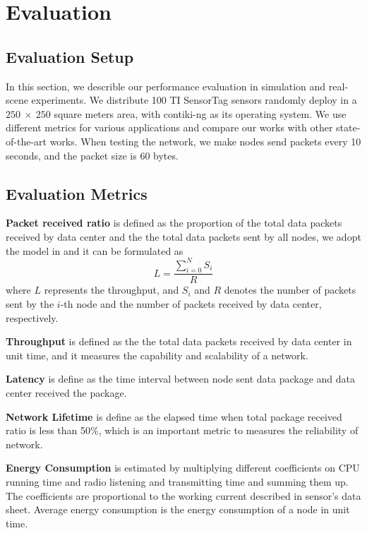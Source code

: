 \section{Evaluation}
\label{Eva}

\subsection{Evaluation Setup}
In this section, we describle our performance evaluation in simulation and
real-scene experiments. We distribute 100 TI SensorTag sensors randomly deploy in a
$250~\times~250$ square meters area, with contiki-ng as its operating system. We
use different metrics for various applications and compare our works with other
state-of-the-art works. When testing the network, we make nodes send packets
every 10 seconds, and the packet size is 60 bytes.

\subsection{Evaluation Metrics}

\textbf{Packet received ratio} is defined as the proportion of the total data
packets received by data center and the the total data packets sent by all nodes, 
we adopt the model in \cite{chen2017energy}
and it can be formulated as
\begin{equation}
	L = \frac{\sum_{i = 0}^{N}S_i}{R}
\end{equation}
where $L$ represents the throughput, and $S_i$ and $R$ denotes the number of
packets sent by the $i$-th node and the number of packets received by data
center, respectively.

\textbf{Throughput} is defined as the the total data packets received by data
center in unit time, and it measures the capability and scalability of a network.

\textbf{Latency} is define as the time interval between node sent data package and
data center received the package.

\textbf{Network Lifetime} is define as the elapsed time when total package
received ratio is less than 50\%, which is an important metric to measures the
reliability of network.

\textbf{Energy Consumption} is estimated by multiplying different coefficients on
CPU running time and radio listening and transmitting time and summing them up.
The coefficients are proportional to the working current described in sensor's
data sheet. Average energy consumption is the energy consumption of a node in
unit time.

